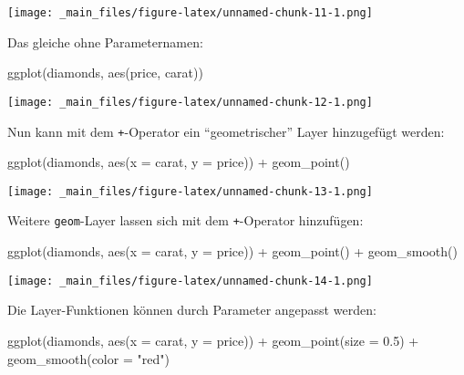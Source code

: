\documentclass[
  ngerman,
]{article}
\newenvironment{Shaded}{\begin{snugshade}}{\end{snugshade}}
\newcommand{\AttributeTok}[1]{\textcolor[rgb]{0.77,0.63,0.00}{#1}}
\newcommand{\FloatTok}[1]{\textcolor[rgb]{0.00,0.00,0.81}{#1}}
\newcommand{\FunctionTok}[1]{\textcolor[rgb]{0.00,0.00,0.00}{#1}}
\newcommand{\NormalTok}[1]{#1}
\newcommand{\SpecialCharTok}[1]{\textcolor[rgb]{0.00,0.00,0.00}{#1}}
\newcommand{\StringTok}[1]{\textcolor[rgb]{0.31,0.60,0.02}{#1}}
\begin{document}
\texttt{[image: \_main\_files/figure-latex/unnamed-chunk-11-1.png]}

Das gleiche ohne Parameternamen:

\begin{Shaded}
\begin{Highlighting}[]
\FunctionTok{ggplot}\NormalTok{(diamonds, }\FunctionTok{aes}\NormalTok{(price, carat))}
\end{Highlighting}
\end{Shaded}

\texttt{[image: \_main\_files/figure-latex/unnamed-chunk-12-1.png]}

Nun kann mit dem \texttt{+}-Operator ein ``geometrischer'' Layer hinzugefügt werden:

\begin{Shaded}
\begin{Highlighting}[]
\FunctionTok{ggplot}\NormalTok{(diamonds, }\FunctionTok{aes}\NormalTok{(}\AttributeTok{x =}\NormalTok{ carat, }\AttributeTok{y =}\NormalTok{ price)) }\SpecialCharTok{+}
  \FunctionTok{geom\_point}\NormalTok{()}
\end{Highlighting}
\end{Shaded}

\texttt{[image: \_main\_files/figure-latex/unnamed-chunk-13-1.png]}

Weitere \texttt{geom}-Layer lassen sich mit dem \texttt{+}-Operator hinzufügen:

\begin{Shaded}
\begin{Highlighting}[]
\FunctionTok{ggplot}\NormalTok{(diamonds, }\FunctionTok{aes}\NormalTok{(}\AttributeTok{x =}\NormalTok{ carat, }\AttributeTok{y =}\NormalTok{ price)) }\SpecialCharTok{+}
  \FunctionTok{geom\_point}\NormalTok{() }\SpecialCharTok{+}
  \FunctionTok{geom\_smooth}\NormalTok{()}
\end{Highlighting}
\end{Shaded}

\texttt{[image: \_main\_files/figure-latex/unnamed-chunk-14-1.png]}

Die Layer-Funktionen können durch Parameter angepasst werden:

\begin{Shaded}
\begin{Highlighting}[]
\FunctionTok{ggplot}\NormalTok{(diamonds, }\FunctionTok{aes}\NormalTok{(}\AttributeTok{x =}\NormalTok{ carat, }\AttributeTok{y =}\NormalTok{ price)) }\SpecialCharTok{+}
  \FunctionTok{geom\_point}\NormalTok{(}\AttributeTok{size =} \FloatTok{0.5}\NormalTok{) }\SpecialCharTok{+}
  \FunctionTok{geom\_smooth}\NormalTok{(}\AttributeTok{color =} \StringTok{"red"}\NormalTok{)}
\end{Highlighting}
\end{Shaded}
\end{document}
